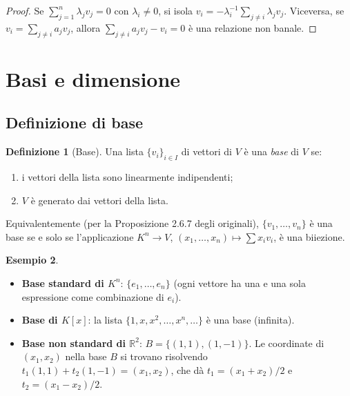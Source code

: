 \documentclass[11pt, a4paper]{book}
\theoremstyle{definition}
\newtheorem{definizione}{Definizione}[section]
\newtheorem{esempio}[definizione]{Esempio}
\theoremstyle{plain}
\theoremstyle{remark}
\newcommand{\R}{\mathbb{R}}
\begin{document}
\begin{proof}
Se $\sum_{j=1}^n \lambda_j v_j = 0$ con $\lambda_i \neq 0$, si isola $v_i = -\lambda_i^{-1} \sum_{j \neq i} \lambda_j v_j$. Viceversa, se $v_i = \sum_{j \neq i} a_j v_j$, allora $\sum_{j \neq i} a_j v_j - v_i = 0$ è una relazione non banale.
\end{proof}

\section{Basi e dimensione}

\subsection{Definizione di base}

\begin{defbox}
\begin{definizione}[Base]
Una lista $\{v_i\}_{i \in I}$ di vettori di $V$ è una \emph{base} di $V$ se:
\begin{enumerate}
  \item i vettori della lista sono linearmente indipendenti;
  \item $V$ è generato dai vettori della lista.
\end{enumerate}
\end{definizione}
\end{defbox}

Equivalentemente (per la Proposizione 2.6.7 degli originali), $\{v_1,\ldots,v_n\}$ è una base se e solo se l'applicazione $K^n \to V$, $(x_1,\ldots,x_n) \mapsto \sum x_i v_i$, è una biiezione.

\begin{exbox}
\begin{esempio}
\begin{itemize}
  \item \textbf{Base standard di $K^n$}: $\{e_1, \ldots, e_n\}$ (ogni vettore ha una e una sola espressione come combinazione di $e_i$).
  \item \textbf{Base di $K[x]$}: la lista $\{1, x, x^2, \ldots, x^n, \ldots\}$ è una base (infinita).
  \item \textbf{Base non standard di $\R^2$}: $B = \{(1,1), (1,-1)\}$. Le coordinate di $(x_1, x_2)$ nella base $B$ si trovano risolvendo $t_1(1,1) + t_2(1,-1) = (x_1,x_2)$, che dà $t_1 = (x_1+x_2)/2$ e $t_2 = (x_1-x_2)/2$.
\end{itemize}
\end{esempio}
\end{exbox}
\end{document}
